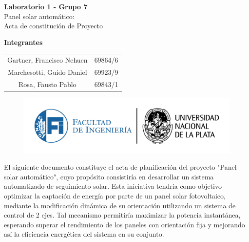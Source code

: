 \documentclass[a4paper,12pt]{article}
\begin{document}
\begin{titlepage}
    \begin{center}
        \vspace*{3cm}
        
        {\Huge \textbf{Laboratorio 1 - Grupo 7}}\\[1cm]
        {\LARGE Panel solar automático:\\ [0.5cm]Acta de constitución de Proyecto}\\[2cm]
        
        \vfill
        
        {\Large \textbf{Integrantes }}\\[.5cm]
        \large
        \begin{tabular}{c c}
            Gartner, Francisco Nehuen & 69864/6 \\
            Marchesotti, Guido Daniel & 69923/9 \\
            Rosa, Fausto Pablo & 69843/1 \\
        \end{tabular}
        
        \vspace{1cm}
        
        \begin{figure}[b]
            \centering
            \includegraphics[width=1\linewidth]{LOGOSFI-UNLP-color-01.png}
        \end{figure}
        
    \end{center}
\end{titlepage}


El siguiente documento constituye el acta de planificación del proyecto "Panel solar automático", cuyo propósito consistiría en desarrollar un sistema automatizado de seguimiento solar. Esta iniciativa tendría como objetivo optimizar la captación de energía por parte de un panel solar fotovoltaico, mediante la modificación dinámica de su orientación utilizando un sistema de control de 2 ejes. Tal mecanismo permitiría maximizar la potencia instantánea, esperando superar el rendimiento de los paneles con orientación fija y mejorando así la eficiencia energética del sistema en su conjunto.\\
\end{document}
